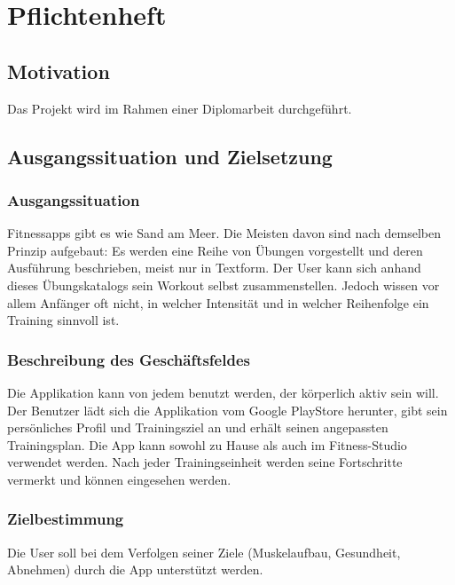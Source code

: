 \documentclass[FIPLY_base.tex]{subfiles}
\begin{document}
	\section{Pflichtenheft}
	
	\subsection{Motivation}
	Das Projekt wird im Rahmen einer Diplomarbeit durchgeführt.
	\subsection{Ausgangssituation und Zielsetzung}
	\subsubsection{Ausgangssituation}
	Fitnessapps gibt es wie Sand am Meer. Die Meisten davon sind nach demselben Prinzip aufgebaut: Es werden eine Reihe von Übungen vorgestellt und deren Ausführung beschrieben, meist nur in Textform. Der User kann sich anhand dieses Übungskatalogs sein Workout selbst zusammenstellen. Jedoch wissen vor allem Anfänger oft nicht, in welcher Intensität und in welcher Reihenfolge ein Training sinnvoll ist. 
	\subsubsection{Beschreibung des Geschäftsfeldes}
	Die Applikation kann von jedem benutzt werden, der körperlich aktiv sein will. Der Benutzer lädt sich die Applikation vom Google PlayStore herunter, gibt sein persönliches Profil und Trainingsziel an und erhält seinen angepassten Trainingsplan. Die App kann sowohl zu Hause als auch im Fitness-Studio verwendet werden. Nach jeder Trainingseinheit werden seine Fortschritte vermerkt und können eingesehen werden.
	\subsubsection{Zielbestimmung}
	Die User soll bei dem Verfolgen seiner Ziele (Muskelaufbau, Gesundheit, Abnehmen) durch die App unterstützt werden.
	
\end{document}
